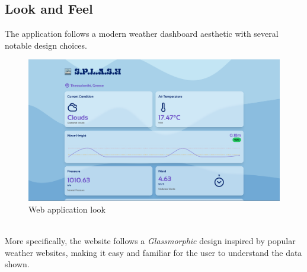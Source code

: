 \documentclass{article}
\begin{document}
\subsection{Look and Feel}
    The application follows a modern weather dashboard aesthetic with several notable design choices.
    \begin{figure}[h]
        \centering
        \includegraphics[width=1\linewidth]{assets/FE_F2.png}
        \caption{Web application look}
        \label{fig:frontend}
    \end{figure}
    \\
    More specifically, the website follows a \textit{Glassmorphic} design inspired by popular weather websites, making it easy and familiar for the user to understand the data shown.
    
\end{document}
